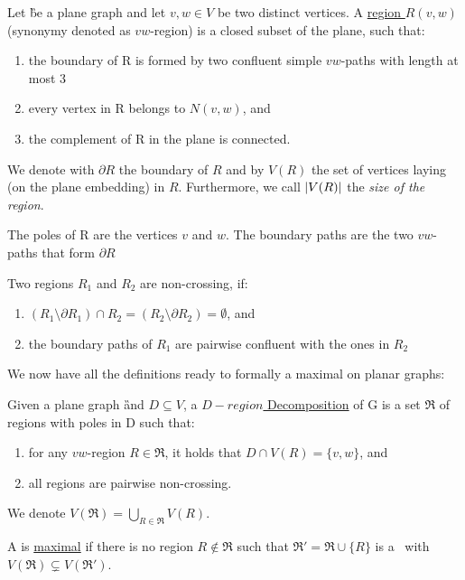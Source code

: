 
\begin{definition}
    Let \G be a plane graph and let $v,w \in V$ be two distinct vertices. A \underline{ region $R(v,w)$} (synonymy denoted as  $vw$-region) is a closed subset of the plane, such that:
    \begin{enumerate}
        \item the boundary of R is formed by two confluent simple $vw$-paths with length at most 3
        \item every vertex in R belongs to $N(v,w)$, and
        \item the complement of R in the plane is connected.
    \end{enumerate}
    
    We denote with $\partial R$ the boundary of $R$ and by $V(R)$ the set of vertices laying (on the plane embedding) in $R$. Furthermore, we call $\abs{V(R)}$ the \textit{size of the region}.
    
    The poles of R are the vertices $v$ and $w$. The boundary paths are the two $vw$-paths that form $\partial R$
    
\end{definition}

\begin{definition}
    Two regions $R_1$ and $R_2$ are non-crossing, if:
    \begin{enumerate}
        \item $(R_1 \setminus \partial R_1) \cap R_2 = (R_2 \setminus \partial R_2) = \emptyset$, and
        \item the boundary paths of $R_1$ are pairwise confluent with the ones in $R_2$
    \end{enumerate}
\end{definition}

We now have all the definitions ready to formally a maximal \dreg on planar graphs:

\begin{definition}\label{def:region}
    Given a plane graph \G and $D\subseteq V$, a \underline{$D-region$ Decomposition} of G is a set $\mathfrak{R}$ of regions with poles in D such that: 
    \begin{enumerate}
        \item for any $vw$-region $R \in \mathfrak{R} $, it holds that $D \cap V(R) = \{v, w\}$, and
        \item all regions are pairwise non-crossing.
    \end{enumerate}
    We denote $V(\mathfrak{R}) = \bigcup\limits_{R \in \mathfrak{R}} V(R)$. 
    
    \noindent A \dreg is \underline{maximal} if there is no region $R \notin \mathfrak{R}$ such that $\mathfrak{R}' = \mathfrak{R} \cup \{R\}$ is a \dreg~with $V(\mathfrak{R}) \subsetneq V(\mathfrak{R}')$.
\end{definition}


